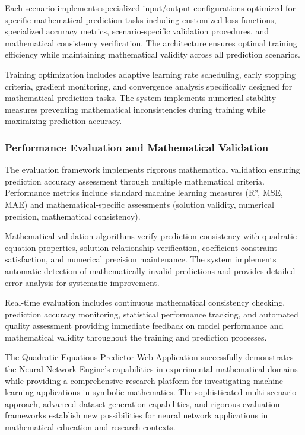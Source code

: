 \documentclass[11pt,a4paper]{report}
\begin{document}
Each scenario implements specialized input/output configurations optimized for specific mathematical prediction tasks including customized loss functions, specialized accuracy metrics, scenario-specific validation procedures, and mathematical consistency verification. The architecture ensures optimal training efficiency while maintaining mathematical validity across all prediction scenarios.

Training optimization includes adaptive learning rate scheduling, early stopping criteria, gradient monitoring, and convergence analysis specifically designed for mathematical prediction tasks. The system implements numerical stability measures preventing mathematical inconsistencies during training while maximizing prediction accuracy.

\subsubsection{Performance Evaluation and Mathematical Validation}

The evaluation framework implements rigorous mathematical validation ensuring prediction accuracy assessment through multiple mathematical criteria. Performance metrics include standard machine learning measures (R², MSE, MAE) and mathematical-specific assessments (solution validity, numerical precision, mathematical consistency).

Mathematical validation algorithms verify prediction consistency with quadratic equation properties, solution relationship verification, coefficient constraint satisfaction, and numerical precision maintenance. The system implements automatic detection of mathematically invalid predictions and provides detailed error analysis for systematic improvement.

Real-time evaluation includes continuous mathematical consistency checking, prediction accuracy monitoring, statistical performance tracking, and automated quality assessment providing immediate feedback on model performance and mathematical validity throughout the training and prediction processes.

The Quadratic Equations Predictor Web Application successfully demonstrates the Neural Network Engine's capabilities in experimental mathematical domains while providing a comprehensive research platform for investigating machine learning applications in symbolic mathematics. The sophisticated multi-scenario approach, advanced dataset generation capabilities, and rigorous evaluation frameworks establish new possibilities for neural network applications in mathematical education and research contexts.
\end{document}
